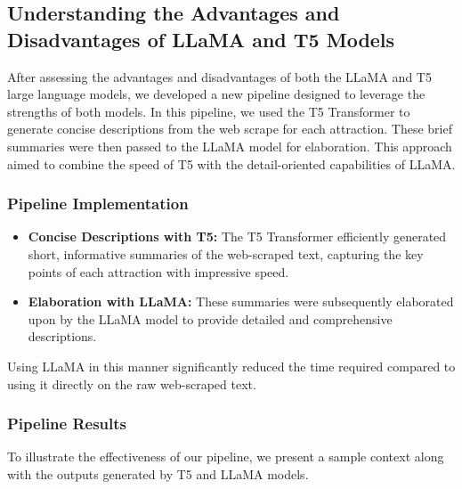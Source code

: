 \documentclass[conference]{IEEEtran}
\begin{document}
 \subsection{Understanding the Advantages and Disadvantages of LLaMA and T5 Models}

After assessing the advantages and disadvantages of both the LLaMA and T5 large language models, we developed a new pipeline designed to leverage the strengths of both models. In this pipeline, we used the T5 Transformer to generate concise descriptions from the web scrape for each attraction. These brief summaries were then passed to the LLaMA model for elaboration. This approach aimed to combine the speed of T5 with the detail-oriented capabilities of LLaMA.\\

\subsubsection{{\textbf{Pipeline Implementation}}}
\begin{itemize}
    \item \textbf{Concise Descriptions with T5:} The T5 Transformer efficiently generated short, informative summaries of the web-scraped text, capturing the key points of each attraction with impressive speed.
    \item \textbf{Elaboration with LLaMA:} These summaries were subsequently elaborated upon by the LLaMA model to provide detailed and comprehensive descriptions.
\end{itemize}


Using LLaMA in this manner significantly reduced the time required compared to using it directly on the raw web-scraped text.

\subsubsection{Pipeline Results}

To illustrate the effectiveness of our pipeline, we present a sample context along with the outputs generated by T5 and LLaMA models.
\end{document}

